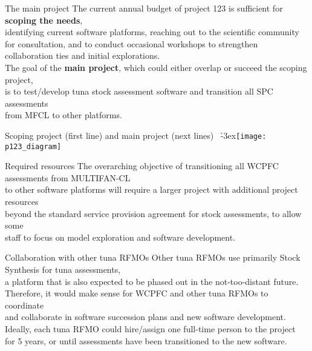 \documentclass[aspectratio=169,fleqn]{beamer}
\begin{document}
\begin{frame}{The main project}
  The current annual budget of project 123 is sufficient for {\darkgreen\bf
    scoping the needs},\\[0.5ex]
  identifying current software platforms, reaching out to the scientific
  community\\[0.5ex]
  for consultation, and to conduct occasional workshops to strengthen\\[0.5ex]
  collaboration ties and initial explorations.\\[5ex]
  The goal of the {\darkgreen\bf main project}, which could either overlap or
  succeed the scoping project,\\[0.5ex]
  is to test/develop tuna stock assessment software and transition all SPC
  assessments\\[0.5ex]
  from MFCL to other platforms.\\[2ex]
\end{frame}


\begin{frame}{Scoping project (first line) and main project (next lines)}
  \vspace{1ex}
  ~\h{-3ex}\texttt{[image: p123\_diagram]}
\end{frame}


\begin{frame}{Required resources}
  The overarching objective of transitioning all WCPFC assessments from
  MULTIFAN-CL\\[0.5ex]
  to other software platforms will require a larger project with
  additional project resources\\[0.5ex]
  beyond the standard service provision agreement for stock assessments, to
  allow some\\[0.5ex]
  staff to focus on model exploration and software development.
\end{frame}


\begin{frame}{Collaboration with other tuna RFMOs}
  Other tuna RFMOs use primarily Stock Synthesis for tuna assessments,\\[0.5ex]
  a platform that is also expected to be phased out in the not-too-distant
  future.\\[0.5ex]
  Therefore, it would make sense for WCPFC and other tuna RFMOs to
  coordinate\\[0.5ex]
  and collaborate in software succession plans and new software
  development.\\[5ex]
  Ideally, each tuna RFMO could hire/assign one full-time person to the
  project\\[0.5ex]
  for 5 years, or until assessments have been transitioned to the new
  software.\\[4ex]
\end{frame}
\end{document}
